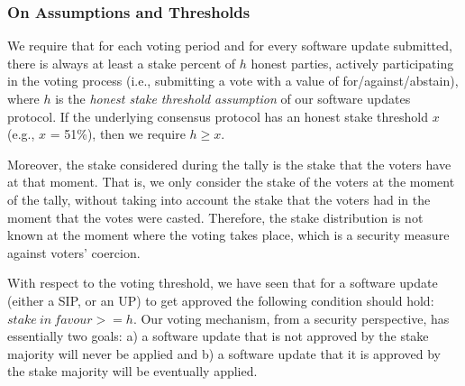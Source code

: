 \subsubsection{On Assumptions and Thresholds}
We require that for each voting period and for every software update submitted, there is always at least a stake percent of $h$ honest parties, actively participating in the voting process (i.e., submitting a vote with a value of for/against/abstain), where $h$ is the \emph{honest stake threshold assumption} of our software updates protocol. %
If the underlying consensus protocol has an honest stake threshold $x$ (e.g., $x$ = 51\%), then we require $h \geq x$. %

Moreover, the stake considered during the tally is the stake that the voters have at that moment. That is, we only consider the stake of the voters at the moment of the tally, without taking into account the stake that the voters had in the moment that the votes were casted. Therefore, the stake distribution is not known at the moment where the voting takes place, which is a security measure against voters' coercion.

With respect to the voting threshold, we have seen that for a software update (either a SIP, or an UP) to get approved the following condition should hold: $stake\ in\ favour >= h$. Our voting mechanism, from a security perspective, has essentially two goals: a) a software update that is not approved by the stake majority will never be applied and b)  a software update that it is approved by the stake majority will be eventually applied.

